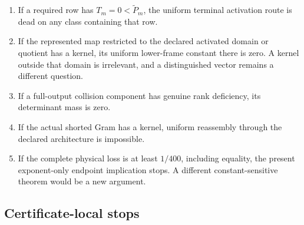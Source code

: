\begin{enumerate}[label=\textup{(H\arabic*)},leftmargin=3.6em]
 \item If a required row has \(T_m=0<\widetilde P_m\), the uniform terminal
       activation route is dead on any class containing that row.
 \item If the represented map restricted to the declared activated domain
       or quotient has a kernel, its uniform lower-frame constant there is
       zero.  A kernel outside that domain is irrelevant, and a
       distinguished vector remains a different question.
 \item If a full-output collision component has genuine rank deficiency,
       its determinant mass is zero.
 \item If the actual shorted Gram has a kernel, uniform reassembly through
       the declared architecture is impossible.
 \item If the complete physical loss is at least \(1/400\), including
       equality, the present exponent-only endpoint implication stops.  A
       different constant-sensitive theorem would be a new argument.
\end{enumerate}

\subsection{Certificate-local stops}

